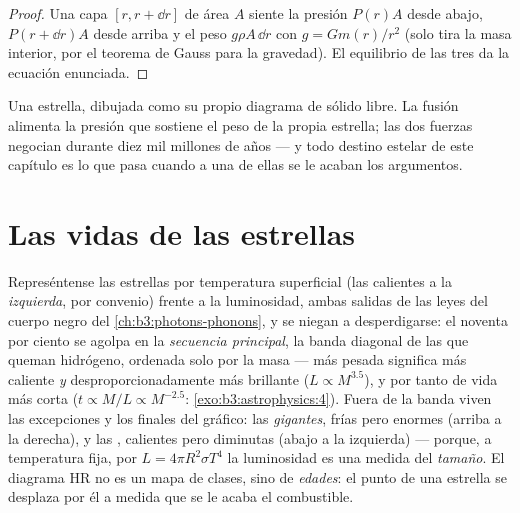 \begin{proof}
Una capa $[r, r + \dd r]$ de área $A$ siente la presión $P(r)A$ desde
abajo, $P(r + \dd r)A$ desde arriba y el peso $g\rho A\,\dd r$
con $g = Gm(r)/r^2$ (solo tira la masa interior, por el teorema de
Gauss para la gravedad). El equilibrio de las tres da la
ecuación enunciada.
\end{proof}

\begin{omfigure}

{\small Una estrella, dibujada como su propio diagrama de sólido libre. La fusión alimenta
la presión que sostiene el peso de la propia estrella; las dos fuerzas
negocian durante diez mil millones de años --- y todo destino estelar de este
capítulo es lo que pasa cuando a una de ellas se le acaban los argumentos.}
\end{omfigure}

\section{Las vidas de las estrellas}

\begin{definition}\label{def:b3:astrophysics:hr}
Represéntense las estrellas por temperatura superficial (las calientes a la \emph{izquierda}, por
convenio) frente a la luminosidad, ambas salidas de las leyes del cuerpo negro
del \cref{ch:b3:photons-phonons}, y se niegan a
desperdigarse: el noventa por ciento se agolpa en la \emph{secuencia principal}, la
banda diagonal de las que queman hidrógeno, ordenada solo por la masa ---
más pesada significa más caliente \emph{y} desproporcionadamente más brillante
($L \propto M^{3.5}$), y por tanto de vida más corta
($t \propto M/L \propto M^{-2.5}$:
\cref{exo:b3:astrophysics:4}). Fuera de la banda viven las
excepciones y los finales del gráfico: las \emph{gigantes}, frías pero enormes
(arriba a la derecha), y las \emph{}, calientes pero diminutas (abajo a la izquierda)
--- porque, a temperatura fija, por $L = 4\pi R^2\sigma T^4$
la luminosidad es una medida del \emph{tamaño}. El diagrama HR no es un
mapa de clases, sino de \emph{edades}: el punto de una estrella se desplaza por él a medida que
se le acaba el combustible.
\end{definition}

